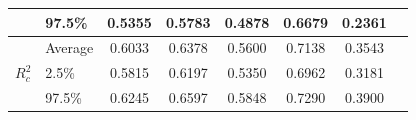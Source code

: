 \begin{table}[H]
\begin{tabular}{@{}llcccccc@{}}
                                           & 97.5\%  & 0.5355 & 0.5783 & 0.4878 & 0.6679 & 0.2361 \\ \midrule
      \multirow{3}{*}{$R^2_c$}            & Average & 0.6033 & 0.6378 & 0.5600 & 0.7138 & 0.3543 \\
                                           & 2.5\%   & 0.5815 & 0.6197 & 0.5350 & 0.6962 & 0.3181 \\
                                           & 97.5\%  & 0.6245 & 0.6597 & 0.5848 & 0.7290 & 0.3900 \\ \bottomrule
    \end{tabular}

\end{table}

